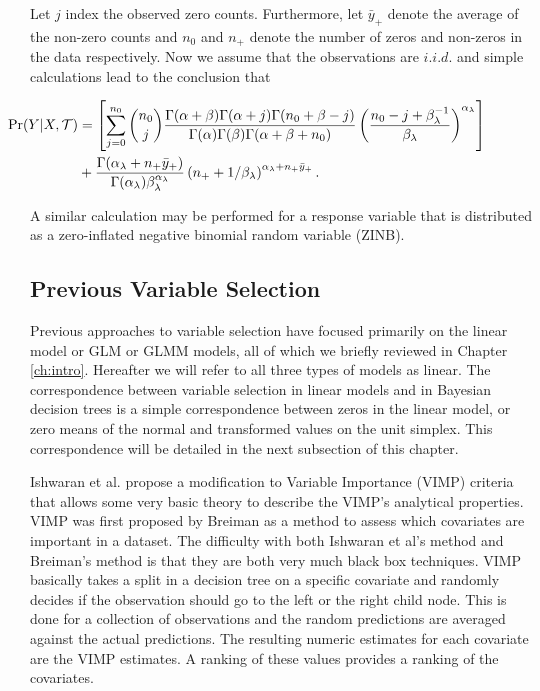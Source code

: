 Let $j$ index the observed zero counts. Furthermore, let $\bar{y}_{+}$ denote the average of the non-zero counts and $n_0$ and $n_+$ denote the number of zeros and non-zeros in the data respectively. 
 Now we assume that the observations are $i.i.d.$ and simple calculations lead to the conclusion that
 
 \begin{align}\label{eqn:zip_int_lhood}\hspace{-.7in}
 \Pr(Y\vert X, \mathcal{T})& = \left[\sum_{j=0}^{n_0} {n_0 \choose j}\frac{\Gamma(\alpha+\beta)\Gamma(\alpha+j)\Gamma(n_0+\beta-j)}{\Gamma(\alpha)\Gamma(\beta)\Gamma(\alpha+\beta+n_0)}\left(\frac{n_0-j+\beta_{\lambda}^{-1}}{\beta_{\lambda}}\right)^{\alpha_{\lambda}} \right] \\ \nonumber
 & + \frac{\Gamma(\alpha_{\lambda}+n_+\bar{y}_+)}{\Gamma(\alpha_{\lambda})\beta_{\lambda}^{\alpha_{\lambda}}}\left(n_+ + 1/\beta_{\lambda} \right)^{\alpha_{\lambda}+n_+\bar{y}_+}.
\end{align}

A similar calculation may be performed for a response variable that is distributed as a zero-inflated negative binomial random variable (ZINB).
 
\subsection{Previous Variable Selection}
\label{ch:p4sub_var_sel}

Previous approaches to variable selection have focused primarily on the linear model or GLM or GLMM models, all of which we briefly reviewed in Chapter \ref{ch:intro}. Hereafter we will refer to all three types of models as linear. The correspondence between variable selection in linear models and in Bayesian decision trees is a simple correspondence between zeros in the linear model, or zero means of the normal and transformed values on the unit simplex. This correspondence will be detailed in the next subsection of this chapter.   

Ishwaran et al. \cite{ishwaran2010high} propose a modification to Variable Importance (VIMP) criteria that allows some very basic theory to describe the VIMP's analytical properties. VIMP was first proposed by Breiman \cite{breiman2001random} as a method to assess which covariates are important in a dataset. The difficulty with both Ishwaran et al's method and Breiman's method is that they are both very much black box techniques. VIMP basically takes a split in a decision tree on a specific covariate and randomly decides if the observation should go to the left or the right child node. This is done for a collection of observations and the random predictions are averaged against the actual predictions. The resulting numeric estimates for each covariate are the VIMP estimates. A ranking of these values provides a ranking of the covariates. 

